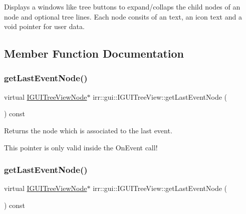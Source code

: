 Displays a windows like tree buttons to expand/collaps the child nodes of an node and optional tree lines. Each node consits of an text, an icon text and a void pointer for user data. 

\subsection{Member Function Documentation}
\mbox{\label{classirr_1_1gui_1_1IGUITreeView_acddfaf6a9b418100d0ec42df52874765}} 
\subsubsection{\texorpdfstring{get\+Last\+Event\+Node()}{getLastEventNode()}\hspace{0.1cm}{\footnotesize\ttfamily [1/2]}}
{\footnotesize\ttfamily virtual \hyperlink{classirr_1_1gui_1_1IGUITreeViewNode}{I\+G\+U\+I\+Tree\+View\+Node}$\ast$ irr\+::gui\+::\+I\+G\+U\+I\+Tree\+View\+::get\+Last\+Event\+Node (\begin{DoxyParamCaption}{ }\end{DoxyParamCaption}) const\hspace{0.3cm}{\ttfamily [pure virtual]}}



Returns the node which is associated to the last event. 

This pointer is only valid inside the On\+Event call! \mbox{\label{classirr_1_1gui_1_1IGUITreeView_acddfaf6a9b418100d0ec42df52874765}} 
\subsubsection{\texorpdfstring{get\+Last\+Event\+Node()}{getLastEventNode()}\hspace{0.1cm}{\footnotesize\ttfamily [2/2]}}
{\footnotesize\ttfamily virtual \hyperlink{classirr_1_1gui_1_1IGUITreeViewNode}{I\+G\+U\+I\+Tree\+View\+Node}$\ast$ irr\+::gui\+::\+I\+G\+U\+I\+Tree\+View\+::get\+Last\+Event\+Node (\begin{DoxyParamCaption}{ }\end{DoxyParamCaption}) const\hspace{0.3cm}{\ttfamily [pure virtual]}}



